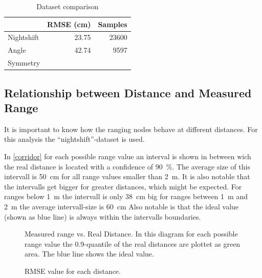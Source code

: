 \begin{table}[h]
	\centering	
	\begin{tabular}{l | r | r}
	           & RMSE (cm) & Samples \\ \hline
	Nightshift & 23.75     & 23600   \\ 
	Angle      & 42.74     & 9597    \\
	Symmetry   & \\
	
	\end{tabular}

	\caption{Dataset comparison}
	\label{datasets}
	
\end{table}

\subsection{Relationship between Distance and Measured Range}

It is important to know how the ranging nodes behave at different distances.
For this analysis the \enquote{nightshift}-dataset is used.

In \autoref{corridor} for each possible range value an interval is shown in between wich the real distance is located with a confidence of \SI{90}{\percent}.
The average size of this intervall is \SI{50}{cm} for all range values smaller than \SI{2}{m}.
It is also notable that the intervalls get bigger for greater distances, which might be expected.
For ranges below \SI{1}{m} the intervall is only \SI{38}{cm} big for ranges between \SI{1}{m} and \SI{2}{m} the average intervall-size is \SI{60}{cm}
Also notable is that the ideal value (shown as blue line) is always within the intervalls boundaries.

\begin{figure}[h]
	\centering
	
	\caption[ Measured range vs. Real Distance ]{Measured range vs. Real Distance. In this diagram for each possible range value the 0.9-quantile of the real distances are plottet as green area. The blue line shows the ideal value.}
	\label{corridor}
\end{figure}

\begin{figure}[h]
	\centering
	
	\caption[ RMSE over distance ]{RMSE value for each distance.}
	\label{corridor}
\end{figure}



